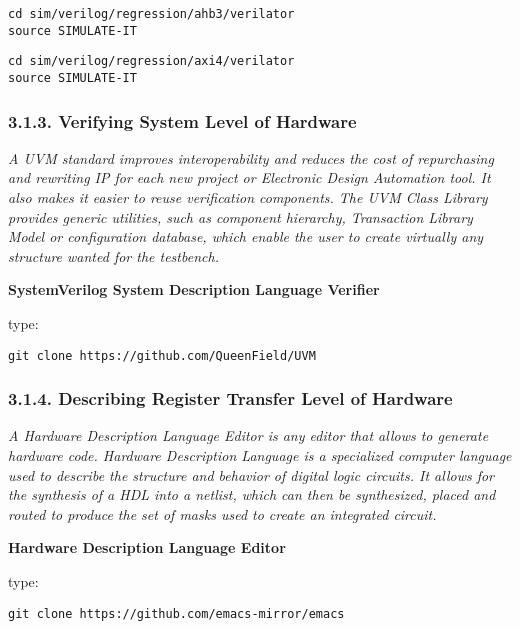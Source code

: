 \documentclass[]{article}
\begin{document}
\begin{verbatim}
cd sim/verilog/regression/ahb3/verilator
source SIMULATE-IT
\end{verbatim}

\begin{verbatim}
cd sim/verilog/regression/axi4/verilator
source SIMULATE-IT
\end{verbatim}

\subsubsection{3.1.3. Verifying System Level of
Hardware}\label{verifying-system-level-of-hardware}

\emph{A UVM standard improves interoperability and reduces the cost of
repurchasing and rewriting IP for each new project or Electronic Design
Automation tool. It also makes it easier to reuse verification
components. The UVM Class Library provides generic utilities, such as
component hierarchy, Transaction Library Model or configuration
database, which enable the user to create virtually any structure wanted
for the testbench.}

\textbf{SystemVerilog System Description Language Verifier}

type:

\begin{verbatim}
git clone https://github.com/QueenField/UVM
\end{verbatim}

\subsubsection{3.1.4. Describing Register Transfer Level of
Hardware}\label{describing-register-transfer-level-of-hardware}

\emph{A Hardware Description Language Editor is any editor that allows
to generate hardware code. Hardware Description Language is a
specialized computer language used to describe the structure and
behavior of digital logic circuits. It allows for the synthesis of a HDL
into a netlist, which can then be synthesized, placed and routed to
produce the set of masks used to create an integrated circuit.}

\textbf{Hardware Description Language Editor}

type:

\begin{verbatim}
git clone https://github.com/emacs-mirror/emacs
\end{verbatim}
\end{document}

